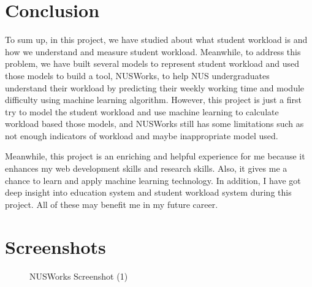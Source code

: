 \documentclass[fyp]{socreport}
\begin{document}
\chapter{Conclusion}
To sum up, in this project, we have studied about what student workload is and how we understand and measure student workload. Meanwhile, to address this problem, we have built several models to represent student workload and used those models to build a tool, NUSWorks, to help NUS undergraduates understand their workload by predicting their weekly working time and module difficulty using machine learning algorithm. However, this project is just a first try to model the student workload and use machine learning to calculate workload based those models, and NUSWorks still has some limitations such as not enough indicators of workload and maybe inappropriate model used.

Meanwhile, this project is an enriching and helpful experience for me because it enhances my web development skills and research skills. Also, it gives me a chance to learn and apply machine learning technology. In addition, I have got deep insight into education system and student workload system during this project. All of these may benefit me in my future career.




\appendix
\chapter{Screenshots}
\begin{figure}
\caption{NUSWorks Screenshot (1)}
\label{screen-1}
\end{figure}
\end{document}
